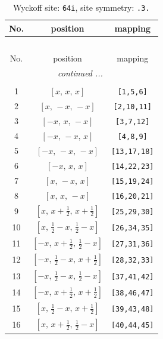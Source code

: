 \documentclass[fleqn,8pt]{jsarticle}
\begin{document}
\begin{longtable}{ccc}
\caption{Wyckoff site: {\tt 64i}, site symmetry: {\tt .3.}}
 \\
 \hline \hline
No. & position & mapping \\ \hline \endfirsthead

\multicolumn{2}{l}{\tablename\ \thetable{}} \\
 \hline \hline
No. & position & mapping \\ \hline \endhead

 \hline \hline
\multicolumn{2}{r}{\footnotesize\it continued ...} \\ \endfoot

 \hline \hline
\multicolumn{2}{r}{} \\ \endlastfoot

1 & $\left[ x,\, x,\, x \right]$ & {\tt [1,5,6]} \\ \hline
2 & $\left[ x,\, - x,\, - x \right]$ & {\tt [2,10,11]} \\ \hline
3 & $\left[ - x,\, x,\, - x \right]$ & {\tt [3,7,12]} \\ \hline
4 & $\left[ - x,\, - x,\, x \right]$ & {\tt [4,8,9]} \\ \hline
5 & $\left[ - x,\, - x,\, - x \right]$ & {\tt [13,17,18]} \\ \hline
6 & $\left[ - x,\, x,\, x \right]$ & {\tt [14,22,23]} \\ \hline
7 & $\left[ x,\, - x,\, x \right]$ & {\tt [15,19,24]} \\ \hline
8 & $\left[ x,\, x,\, - x \right]$ & {\tt [16,20,21]} \\ \hline
9 & $\left[ x,\, x + \frac{1}{2},\, x + \frac{1}{2} \right]$ & {\tt [25,29,30]} \\ \hline
10 & $\left[ x,\, \frac{1}{2} - x,\, \frac{1}{2} - x \right]$ & {\tt [26,34,35]} \\ \hline
11 & $\left[ - x,\, x + \frac{1}{2},\, \frac{1}{2} - x \right]$ & {\tt [27,31,36]} \\ \hline
12 & $\left[ - x,\, \frac{1}{2} - x,\, x + \frac{1}{2} \right]$ & {\tt [28,32,33]} \\ \hline
13 & $\left[ - x,\, \frac{1}{2} - x,\, \frac{1}{2} - x \right]$ & {\tt [37,41,42]} \\ \hline
14 & $\left[ - x,\, x + \frac{1}{2},\, x + \frac{1}{2} \right]$ & {\tt [38,46,47]} \\ \hline
15 & $\left[ x,\, \frac{1}{2} - x,\, x + \frac{1}{2} \right]$ & {\tt [39,43,48]} \\ \hline
16 & $\left[ x,\, x + \frac{1}{2},\, \frac{1}{2} - x \right]$ & {\tt [40,44,45]} \\ \hline

\end{longtable}
\end{document}
